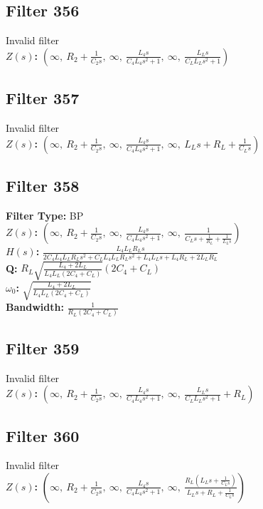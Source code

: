 \documentclass{article}
\begin{document}
\subsection*{Filter 356}
Invalid filter \\ 
\textbf{$Z(s)$:} $\left( \infty, \  R_{2} + \frac{1}{C_{2} s}, \  \infty, \  \frac{L_{4} s}{C_{4} L_{4} s^{2} + 1}, \  \infty, \  \frac{L_{L} s}{C_{L} L_{L} s^{2} + 1}\right)$ \\ 
\subsection*{Filter 357}
Invalid filter \\ 
\textbf{$Z(s)$:} $\left( \infty, \  R_{2} + \frac{1}{C_{2} s}, \  \infty, \  \frac{L_{4} s}{C_{4} L_{4} s^{2} + 1}, \  \infty, \  L_{L} s + R_{L} + \frac{1}{C_{L} s}\right)$ \\ 
\subsection*{Filter 358}
\textbf{Filter Type:} BP \\ 
\textbf{$Z(s)$:} $\left( \infty, \  R_{2} + \frac{1}{C_{2} s}, \  \infty, \  \frac{L_{4} s}{C_{4} L_{4} s^{2} + 1}, \  \infty, \  \frac{1}{C_{L} s + \frac{1}{R_{L}} + \frac{1}{L_{L} s}}\right)$ \\ 
\textbf{$H(s)$:} $\frac{L_{4} L_{L} R_{L} s}{2 C_{4} L_{4} L_{L} R_{L} s^{2} + C_{L} L_{4} L_{L} R_{L} s^{2} + L_{4} L_{L} s + L_{4} R_{L} + 2 L_{L} R_{L}}$ \\ 
\textbf{Q:} $R_{L} \sqrt{\frac{L_{4} + 2 L_{L}}{L_{4} L_{L} \left(2 C_{4} + C_{L}\right)}} \left(2 C_{4} + C_{L}\right)$ \\ 
\textbf{$\omega_0$:} $\sqrt{\frac{L_{4} + 2 L_{L}}{L_{4} L_{L} \left(2 C_{4} + C_{L}\right)}}$ \\ 
\textbf{Bandwidth:} $\frac{1}{R_{L} \left(2 C_{4} + C_{L}\right)}$ \\ 
\subsection*{Filter 359}
Invalid filter \\ 
\textbf{$Z(s)$:} $\left( \infty, \  R_{2} + \frac{1}{C_{2} s}, \  \infty, \  \frac{L_{4} s}{C_{4} L_{4} s^{2} + 1}, \  \infty, \  \frac{L_{L} s}{C_{L} L_{L} s^{2} + 1} + R_{L}\right)$ \\ 
\subsection*{Filter 360}
Invalid filter \\ 
\textbf{$Z(s)$:} $\left( \infty, \  R_{2} + \frac{1}{C_{2} s}, \  \infty, \  \frac{L_{4} s}{C_{4} L_{4} s^{2} + 1}, \  \infty, \  \frac{R_{L} \left(L_{L} s + \frac{1}{C_{L} s}\right)}{L_{L} s + R_{L} + \frac{1}{C_{L} s}}\right)$ \\ 
\end{document}
